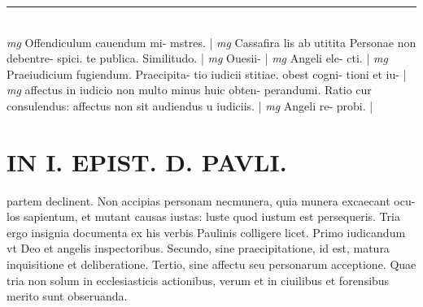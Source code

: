 \documentclass{article}
\begin{document}
\begin{pages}
\vspace{0.5cm}\noindent
\vspace{0.2cm}\rule{1cm}{0.2pt}\\ 
\hspace{0.2cm}\textit{mg}
\footnotesize Offendiculum cauendum mi- mstres. 
\normalsize| 
\hspace{0.2cm}\textit{mg}
\footnotesize Cassafira lis ab utitita Personae non debentre- spici. te publica. Similitudo. 
\normalsize| 
\hspace{0.2cm}\textit{mg}
\footnotesize Ouesii- 
\normalsize| 
\hspace{0.2cm}\textit{mg}
\footnotesize Angeli ele- cti. 
\normalsize| 
\hspace{0.2cm}\textit{mg}
\footnotesize Praeiudicium fugiendum. Praecipita- tio iudicii stitiae. obest cogni- tioni et iu- 
\normalsize| 
\hspace{0.2cm}\textit{mg}
\footnotesize affectus in iudicio non multo minus huic obten- perandumi. Ratio cur consulendus: affectus non sit audiendus u iudiciis. 
\normalsize| 
\hspace{0.2cm}\textit{mg}
\footnotesize Angeli re- probi. 
\normalsize| 
\section*{IN I. EPIST. D. PAVLI. }
\marginpar{[ p.116 ]}\pstart partem declinent. Non accipias personam necmunera, quia munera excaecant ocu- los sapientum, et mutant causas iustas: luste quod iustum est persequeris. Tria ergo insignia documenta ex his verbis Paulinis colligere licet. Primo iudicandum vt Deo et angelis inspectoribus. Secundo, sine praecipitatione, id est, matura inquisitione et deliberatione. Tertio, sine affectu seu personarum acceptione. Quae tria non solum in ecclesiasticis actionibus, verum et in ciuilibus et forensibus merito sunt obseruanda.  \pend
{}
{}

\end{pages}
\end{document}
